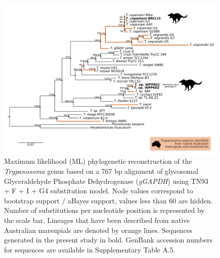 \documentclass[a4paper, nobind]{templates/ociamthesis}
\begin{document}
\begin{figure}
\includegraphics[width=0.95\linewidth]{figures/ms-figs/Ch6-Fig3} \caption[Phylogenetic tree (\textit{GAPDH}) of \textit{Trypanosoma} spp. from the Tasmanian devil.]{Maximum likelihood (ML) phylogenetic reconstruction of the \textit{Trypanosoma} genus based on a 767 bp alignment of glycosomal Glyceraldehyde Phosphate Dehydrogenase (\textit{gGAPDH}) using TN93 + F + I + G4 substitution model. Node values correspond to bootstrap support / aBayes support, values less than 60 are hidden. Number of substitutions per nucleotide position is represented by the scale bar. Lineages that have been described from native Australian marsupials are denoted by orange lines. Sequences generated in the present study in bold. GenBank accession numbers for sequences are available in Supplementary Table A.5.}\label{fig:F63}
\end{figure}
\end{document}
